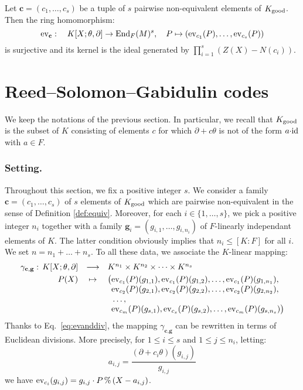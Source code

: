 \documentclass[a4paper]{llncs}
\newcommand{\id}{\textrm{\rm id}}
\newcommand{\End}{\textrm{\rm End}}
\newcommand{\ev}[1]{\textrm{\rm ev}_{#1}}
\renewcommand{\mod}{\,\%\,}
\newcommand{\bc}{\textbf{c}}
\newcommand{\bg}{\textbf{g}}
\newcommand{\good}{\textrm{\rm good}}
\begin{document}
\begin{proposition}
\label{prop:evbc}
Let $\bc = (c_1, \ldots, c_s)$ be a tuple of $s$ pairwise non-equivalent 
elements of $K_\good$.
Then the ring homomorphism:
$$\ev \bc : \quad K[X;\theta,\partial] \to \End_F(M)^s, \quad
P \mapsto (\ev{c_1}(P), \ldots, \ev{c_s}(P))$$
is surjective and its kernel is the ideal generated by
$\prod_{i=1}^s (Z(X) - N(c_i))$.
\end{proposition}

\section{Reed--Solomon--Gabidulin codes}

We keep the notations of the previous section. In particular, we recall 
that $K_\good$ is the subset of $K$ consisting of elements $c$ for which 
$\partial + c\theta$ is not of the form $a{\cdot}\id$ with $a \in F$.

\subsubsection*{Setting.}

Throughout this section, we fix a positive integer $s$. We consider a 
family $\bc = (c_1, \ldots, c_s)$ of $s$ elements of $K_\good$ which are 
pairwise non-equivalent in the sense of Definition \ref{def:equiv}.
Moreover, for each $i \in \{1,\ldots,s\}$, we pick a positive integer
$n_i$ together with a family $\bg_i = (g_{i,1}, \ldots, g_{i,n_i})$ of 
$F$-linearly independant elements of $K$. The latter condition obviously
implies that $n_i \leq [K:F]$ for all $i$.
We set $n = n_1 + \ldots + n_s$.
To all these data, we associate the $K$-linear mapping:
$$\begin{array}{rcl}
\gamma_{\bc,\bg} : \, K[X;\theta,\partial] & \longrightarrow 
 & K^{n_1} \times K^{n_2} \times \cdots \times K^{n_s} \smallskip \\
P(X) & \mapsto 
 & \big(\ev{c_1}(P)(g_{1,1}), \ev{c_1}(P)(g_{1,2}), \ldots, \ev{c_1}(P)(g_{1,n_1}), \\
&& \phantom{\big(}\ev{c_2}(P)(g_{2,1}), \ev{c_2}(P)(g_{2,2}), \ldots, \ev{c_2}(P)(g_{2,n_2}), \\
&& \phantom{\big(}\ldots, \\
&& \phantom{\big(}\ev{c_m}(P)(g_{s,1}), \ev{c_s}(P)(g_{s,2}), \ldots, \ev{c_m}(P)(g_{s,n_s})\big)
\end{array}$$
Thanks to Eq.~\eqref{eq:evanddiv}, the mapping $\gamma_{\bc,\bg}$
can be rewritten in terms of Euclidean divisions. More precisely,
for $1 \leq i \leq s$ and $1 \leq j \leq n_i$, letting:
\begin{equation}
\label{eq:aij}
a_{i,j} = \frac{(\partial + c_i\theta)(g_{i,j})}{g_{i,j}}
\end{equation}
we have $\ev{c_i}(g_{i,j}) = g_{i,j} \cdot P \mod (X - a_{i,j})$.
\end{document}
